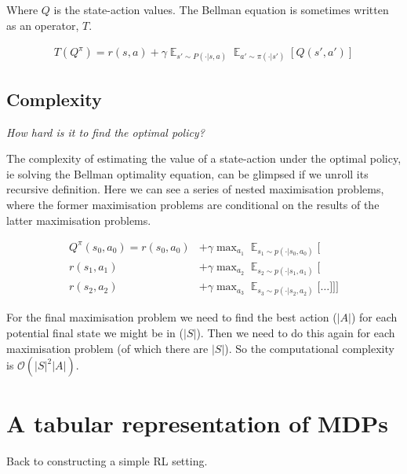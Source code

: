 Where $Q$ is the state-action values.
The Bellman equation is sometimes written as an operator, $T$.

\begin{align*}
T(Q^{\pi}) = r(s, a) + \gamma \mathop{\mathbb E}_{s' \sim P(\cdot|s, a)}\mathop{\mathbb E}_{a'\sim \pi(\cdot | s')} [Q(s', a')]
\end{align*}

\subsection{Complexity}

\begin{displayquote}
  \textsl{How hard is it to find the optimal policy?}
\end{displayquote}

The complexity of estimating the value of a state-action under the optimal policy, ie solving the Bellman optimality
equation, can be glimpsed if we unroll its recursive definition.
Here we can see a series of nested maximisation problems, where the former
maximisation problems are conditional on the results of the latter maximisation problems.

\begin{align*}
Q^{\pi}(s_0, a_0) = r(s_0, a_0) &+ \gamma \mathop{\text{max}}_{a_1} \mathop{\mathbb E}_{s_1\sim p(\cdot | s_0, a_0)} \Bigg[ \\
r(s_1, a_1)  &+ \gamma \mathop{\text{max}}_{a_2} \mathop{\mathbb E}_{s_2\sim p(\cdot | s_1, a_1)} \bigg[\\
r(s_2, a_2)  &+ \gamma \mathop{\text{max}}_{a_3} \mathop{\mathbb E}_{s_3\sim p(\cdot | s_2, a_2)} \Big[
\dots \Big] \bigg] \Bigg]
\end{align*}


For the final maximisation problem we need to find the best action ($|A|$) for each potential final state we might be in ($|S|$).
Then we need to do this again for each maximisation problem (of which there are $|S|$).
So the computational complexity is $\mathcal O(|S|^2|A|)$.

\section{A tabular representation of MDPs}

Back to constructing a simple RL setting.

